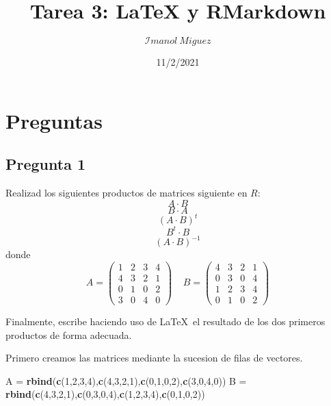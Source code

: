 \documentclass[
]{article}
\title{Tarea 3: LaTeX y RMarkdown}
\author{\(\mathcal Imanol\ Miguez\)}
\date{11/2/2021}
\newenvironment{Shaded}{\begin{snugshade}}{\end{snugshade}}
\newcommand{\DecValTok}[1]{\textcolor[rgb]{0.00,0.00,0.81}{#1}}
\newcommand{\KeywordTok}[1]{\textcolor[rgb]{0.13,0.29,0.53}{\textbf{#1}}}
\newcommand{\NormalTok}[1]{#1}
\newcommand{\StringTok}[1]{\textcolor[rgb]{0.31,0.60,0.02}{#1}}
\begin{document}
\maketitle

\hypertarget{preguntas}{%
\section{Preguntas}\label{preguntas}}

\hypertarget{pregunta-1}{%
\subsection{Pregunta 1}\label{pregunta-1}}

Realizad los siguientes productos de matrices siguiente en \(R\):
\[A\cdot B\] \[B\cdot A\] \[(A\cdot B)^t\] \[B^t\cdot B\]
\[(A\cdot B)^{-1}\] donde
\[A = \begin{pmatrix} 1 & 2 & 3 & 4\\ 4 & 3 & 2 & 1\\ 0 & 1 & 0 & 2\\ 3 & 0 & 4 & 0 \end{pmatrix}\ \ \ \ \ B = \begin{pmatrix} 4 & 3 & 2 & 1\\ 0 & 3 & 0 & 4\\ 1 & 2 & 3 & 4\\ 0 & 1 & 0 & 2 \end{pmatrix}\]

Finalmente, escribe haciendo uso de \LaTeX~el resultado de los dos
primeros productos de forma adecuada.

Primero creamos las matrices mediante la sucesion de filas de vectores.

\begin{Shaded}
\begin{Highlighting}[]
\NormalTok{A =}\StringTok{ }\KeywordTok{rbind}\NormalTok{(}\KeywordTok{c}\NormalTok{(}\DecValTok{1}\NormalTok{,}\DecValTok{2}\NormalTok{,}\DecValTok{3}\NormalTok{,}\DecValTok{4}\NormalTok{),}\KeywordTok{c}\NormalTok{(}\DecValTok{4}\NormalTok{,}\DecValTok{3}\NormalTok{,}\DecValTok{2}\NormalTok{,}\DecValTok{1}\NormalTok{),}\KeywordTok{c}\NormalTok{(}\DecValTok{0}\NormalTok{,}\DecValTok{1}\NormalTok{,}\DecValTok{0}\NormalTok{,}\DecValTok{2}\NormalTok{),}\KeywordTok{c}\NormalTok{(}\DecValTok{3}\NormalTok{,}\DecValTok{0}\NormalTok{,}\DecValTok{4}\NormalTok{,}\DecValTok{0}\NormalTok{))}
\NormalTok{B =}\StringTok{ }\KeywordTok{rbind}\NormalTok{(}\KeywordTok{c}\NormalTok{(}\DecValTok{4}\NormalTok{,}\DecValTok{3}\NormalTok{,}\DecValTok{2}\NormalTok{,}\DecValTok{1}\NormalTok{),}\KeywordTok{c}\NormalTok{(}\DecValTok{0}\NormalTok{,}\DecValTok{3}\NormalTok{,}\DecValTok{0}\NormalTok{,}\DecValTok{4}\NormalTok{),}\KeywordTok{c}\NormalTok{(}\DecValTok{1}\NormalTok{,}\DecValTok{2}\NormalTok{,}\DecValTok{3}\NormalTok{,}\DecValTok{4}\NormalTok{),}\KeywordTok{c}\NormalTok{(}\DecValTok{0}\NormalTok{,}\DecValTok{1}\NormalTok{,}\DecValTok{0}\NormalTok{,}\DecValTok{2}\NormalTok{))}
\end{Highlighting}
\end{Shaded}
\end{document}
